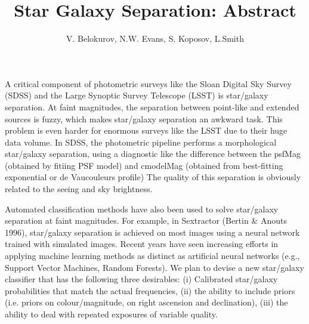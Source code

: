 \documentclass[a4paper]{article}
\title{Star Galaxy Separation: Abstract}
\author{V. Belokurov, N.W. Evans, S. Koposov, L.Smith}
\begin{document}
\maketitle

A critical component of photometric surveys like the Sloan Digital Sky Survey (SDSS) and the Large Synoptic Survey Telescope (LSST) is star/galaxy separation. At faint magnitudes, the separation between point-like and extended sources is fuzzy, which makes star/galaxy separation an awkward task. This problem is even harder for enormous surveys like the LSST due to their huge data volume. In SDSS, the photometric pipeline performs a morphological star/galaxy separation, using a diagnostic like the difference between the psfMag (obtained by fitiing PSF model) and cmodelMag (obtained from best-fitting exponential or de Vaucouleurs profile)
The quality of this separation is obviously related to the seeing and sky brightness.

Automated classification methods have also been used to solve star/galaxy separation at faint magnitudes. For example, in Sextractor (Bertin \& Anouts 1996), star/galaxy separation is achieved on most images using a neural network trained with simulated images. Recent years have seen increasing efforts in applying machine learning methods as distinct as artificial neural networks (e.g., Support Vector Machines, Random Forests). We plan to devise a new star/galaxy classifier that has the following three desirables: (i) Calibrated star/galaxy probabilities that match the actual frequencies, (ii) the ability to include priors (i.e. priors on colour/magnitude, on right ascension and declination), (iii) the ability to deal with repeated exposures of variable quality.
\end{document}
